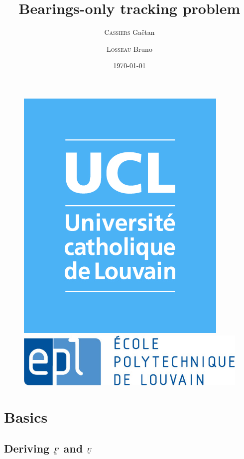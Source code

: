 \documentclass[english,DIV=13]{scrartcl}
\title{Bearings-only tracking problem}
\subtitle{}
\author{\textsc{Cassiers} Gaëtan \and \textsc{Losseau} Bruno}
\date{\today}
\newcommand{\ubar}[1]{\underaccent{\bar}{#1}}
\newcommand{\uvec}[1]{\ubar{#1}}
\newcommand{\umatrix}[1]{\ubar{\ubar{#1}}}
\begin{document}
\maketitle

\vspace{-8.5cm}
\begin{figure}[h!]
\centering
\begin{minipage}{.5\textwidth}
  \includegraphics[width=.3\linewidth]{logo.jpg}
\end{minipage}%
\begin{minipage}{.5\textwidth}
  \flushright \hspace{-2cm}
  \includegraphics[width=.55\linewidth]{epl-logo.jpg}
\end{minipage}
\end{figure}
\vspace{4.5cm}


\tableofcontents

\section{Basics}
\subsection*{Deriving $\umatrix{F}$ and $\uvec{U}$}
\end{document}
